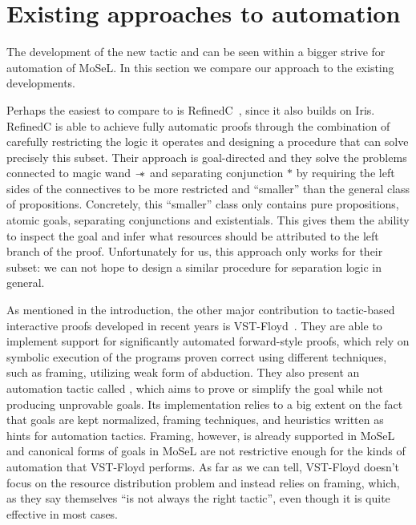 \section{Existing approaches to automation}
\label{sec:exist-appr-autom}

The development of the new  tactic and  can be seen within a bigger strive for automation of MoSeL.
In this section we compare our approach to the existing developments.

Perhaps the easiest to compare to is RefinedC~\cite{sammlerRefinedCExtensibleRefinement2020}, since it also builds on Iris.
  RefinedC is able to achieve fully automatic proofs through the combination of carefully restricting the logic it operates and designing a procedure that can solve precisely this subset.
  Their approach is goal-directed and they solve the problems connected to magic wand \(\mathrel{-\mkern-6mu*}\) and separating conjunction \(*\) by requiring the left sides of the connectives to be more restricted and ``smaller'' than the general class of propositions.
  Concretely, this ``smaller'' class only contains pure propositions, atomic goals, separating conjunctions and existentials.
  This gives them the ability to inspect the goal and infer what resources should be attributed to the left branch of the proof.
  Unfortunately for us, this approach only works for their subset: we can not hope to design a similar procedure for separation logic in general.

  As mentioned in the introduction, the other major contribution to tactic-based interactive proofs developed in recent years is VST-Floyd~\cite{caoVSTFloydSeparationLogic2018}.
  They are able to implement support for significantly automated forward-style proofs, which rely on symbolic execution of the programs proven correct using different techniques, such as framing, utilizing weak form of abduction.
  They also present an automation tactic called , which aims to prove or simplify the goal while not producing unprovable goals.
  Its implementation relies to a big extent on the fact that goals are kept normalized, framing techniques, and heuristics written as hints for automation tactics.
  Framing, however, is already supported in MoSeL and canonical forms of goals in MoSeL are not restrictive enough for the kinds of automation that VST-Floyd performs.
  As far as we can tell, VST-Floyd doesn't focus on the resource distribution problem and instead relies on framing, which, as they say themselves ``is not always the right tactic'', even though it is quite effective in most cases.

